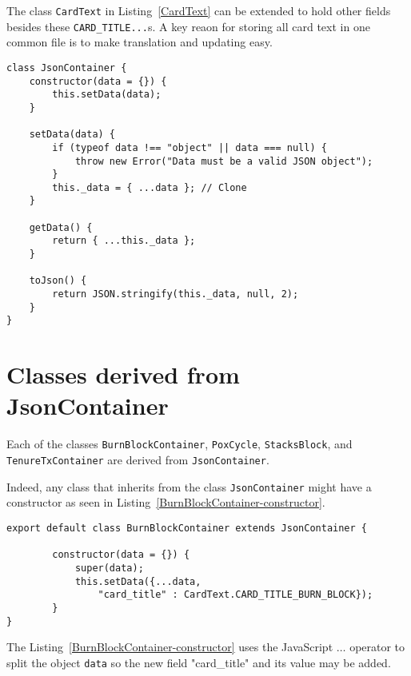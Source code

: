 \documentclass[12pt]{article}
\begin{document}
The class \lstinline|CardText| in 
Listing~\ref{CardText} can be extended to hold other fields besides these \lstinline|CARD_TITLE...|s.
A key reaon for storing all card text in one common file is to make translation and updating easy.

%
%
\vspace{0.2in}
%
%


\begin{lstlisting}[label=JsonContainer,style=JSES6Base, caption={JsonContainer class}]
class JsonContainer {
    constructor(data = {}) {
        this.setData(data);
    }

    setData(data) {
        if (typeof data !== "object" || data === null) {
            throw new Error("Data must be a valid JSON object");
        }
        this._data = { ...data }; // Clone 
    }

    getData() {
        return { ...this._data };
    }

    toJson() {
        return JSON.stringify(this._data, null, 2);
    }
}
\end{lstlisting}

%
%
\vspace{0.2in}
%
%


%
%
\vspace{0.2in}
%
%

%
%
\section{Classes derived from JsonContainer}
%
%
Each of the classes \lstinline|BurnBlockContainer|, \lstinline|PoxCycle|, \lstinline|StacksBlock|, and \lstinline|TenureTxContainer|
are derived from \lstinline|JsonContainer|.

Indeed, any class that inherits from the class \lstinline|JsonContainer| might have a constructor as seen in Listing~\ref{BurnBlockContainer-constructor}.



%
%
%
\begin{lstlisting}[label=BurnBlockContainer-constructor,style=JSES6Base, caption={BurnBlockContainer inheriting from JsonContainer}]
export default class BurnBlockContainer extends JsonContainer {
   
        constructor(data = {}) {
            super(data);
            this.setData({...data, 
				"card_title" : CardText.CARD_TITLE_BURN_BLOCK});
        }
}
\end{lstlisting}

The Listing~\ref{BurnBlockContainer-constructor} uses the JavaScript $\ldots$ operator to split the object \lstinline|data| so the 
new field "card\_title" and its value may be added.
\end{document}
